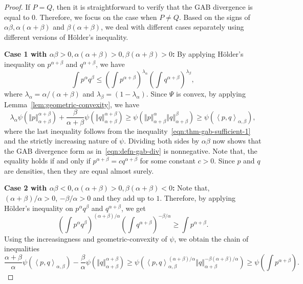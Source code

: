 \documentclass[11pt]{article}
\theoremstyle{plain}
\theoremstyle{remark}
\newcommand{\norm}[1]{\left\Vert #1 \right\Vert}
\newcommand{\inner}[1]{\left\langle #1\right\rangle}
\begin{document}
\begin{proof}
    If $P = Q$, then it is straightforward to verify that the GAB divergence is equal to $0$. Therefore, we focus on the case when $P \neq Q$. Based on the signs of $\alpha\beta,\alpha(\alpha+\beta)$ and $\beta(\alpha+\beta)$, we deal with different cases separately using different versions of H\"{o}lder's inequality.

    \noindent\textbf{Case 1 with $\alpha\beta > 0, \alpha(\alpha+\beta) > 0, \beta(\alpha+\beta) > 0$:} By applying H\"{o}lder's inequality on $p^{\alpha+\beta}$ and $q^{\alpha+\beta}$, we have
    \begin{equation}
        \int p^\alpha q^\beta \leq \left( \int p^{\alpha+\beta} \right)^{\lambda_\alpha} \left( \int q^{\alpha+\beta} \right)^{\lambda_\beta},
        \label{eqn:thm-gab-sufficient-1}
    \end{equation}
    \noindent where $\lambda_\alpha = \alpha/(\alpha+\beta)$ and $\lambda_\beta = (1 - \lambda_\alpha)$. Since $\Psi$ is convex, by applying Lemma~\ref{lem:geometric-convexity}, we have
    \begin{equation*}
        \lambda_\alpha \psi\left( \norm{p}_{\alpha+\beta}^{\alpha+\beta}\right) + \frac{\beta}{\alpha+\beta} \psi\left( \norm{q}_{\alpha+\beta}^{\alpha+\beta}\right)
        \geq  \psi\left( \norm{p}_{\alpha+\beta}^\alpha \norm{q}_{\alpha+\beta}^\beta \right)
        \geq \psi\left( \inner{p,q}_{\alpha,\beta} \right),
    \end{equation*}
    \noindent where the last inequality follows from the inequality~\eqref{eqn:thm-gab-sufficient-1} and the strictly increasing nature of $\psi$. Dividing both sides by $\alpha\beta$ now shows that the GAB divergence form as in~\eqref{eqn:defn-gab-div} is nonnegative. Note that, the equality holds if and only if $p^{\alpha+\beta} = cq^{\alpha+\beta}$ for some constant $c > 0$. Since $p$ and $q$ are densities, then they are equal almost surely.

    \noindent\textbf{Case 2 with $\alpha\beta < 0, \alpha(\alpha+\beta) > 0, \beta(\alpha+\beta) < 0$:} Note that, $(\alpha + \beta)/\alpha > 0$, $-\beta/\alpha > 0$ and they add up to $1$. Therefore, by applying H\"{o}lder's inequality on $p^{\alpha}q^\beta$ and $q^{\alpha+\beta}$, we get
    \begin{equation*}
        \left( \int p^{\alpha} q^\beta \right)^{(\alpha+\beta)/\alpha} \left( \int q^{\alpha+\beta} \right)^{-\beta/\alpha} \geq \int p^{\alpha+\beta}.
    \end{equation*}
    \noindent Using the increasingness and geometric-convexity of $\psi$, we obtain the chain of inequalities
    \begin{equation*}
        \dfrac{\alpha+\beta}{\alpha} \psi\left( \inner{p,q}_{\alpha,\beta} \right) - \dfrac{\beta}{\alpha} \psi\left( \norm{q}_{\alpha+\beta}^{\alpha+\beta} \right)
        \geq \psi\left( \inner{p, q}_{\alpha,\beta}^{(\alpha+\beta)/\alpha} \norm{q}_{\alpha+\beta}^{-\beta(\alpha+\beta)/\alpha} \right)
        \geq \psi\left( \int p^{\alpha+\beta} \right).
    \end{equation*}


\end{proof}
\end{document}

